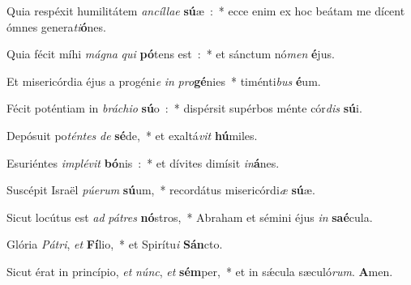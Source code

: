 ﻿\item Quia respéxit humilitátem \emph{an}\-\emph{cíl}\-\emph{lae} \textbf{sú}\-æ~:~* ecce enim ex hoc beátam me dícent ómnes genera\emph{ti}\-\textbf{ó}\-nes.
\item Quia fécit míhi \emph{má}\-\emph{gna} \emph{qui} \textbf{pó}\-tens est~:~* et sánctum nó\emph{men} \textbf{é}\-jus.
\item Et misericórdia éjus a progéni\emph{e} \emph{in} \emph{pro}\-\textbf{gé}\-nies~* timénti\emph{bus} \textbf{é}\-um.
\item Fécit poténtiam in \emph{brá}\-\emph{chi}\-\emph{o} \textbf{sú}\-o~:~* dispérsit supérbos ménte cór\emph{dis} \textbf{sú}\-i.
\item Depósuit po\emph{tén}\-\emph{tes} \emph{de} \textbf{sé}\-de,~* et exaltá\emph{vit} \textbf{hú}\-miles.
\item Esuriéntes \emph{im}\-\emph{plé}\-\emph{vit} \textbf{bó}\-nis~:~* et dívites dimísit \emph{in}\-\textbf{á}\-nes.
\item Suscépit Israël \emph{pú}\-\emph{e}\-\emph{rum} \textbf{sú}\-um,~* recordátus misericórdi\emph{æ} \textbf{sú}\-æ.
\item Sicut locútus est \emph{ad} \emph{pá}\-\emph{tres} \textbf{nó}\-stros,~* Abraham et sémini éjus \emph{in} \textbf{saé}\-cula.
\item Glória \emph{Pá}\-\emph{tri}, \emph{et} \textbf{Fí}\-lio,~* et Spirítu\emph{i} \textbf{Sán}\-cto.
\item Sicut érat in princípio, \emph{et} \emph{núnc}, \emph{et} \textbf{sém}\-per,~* et in sǽcula sæculó\emph{rum}. \textbf{A}\-men.